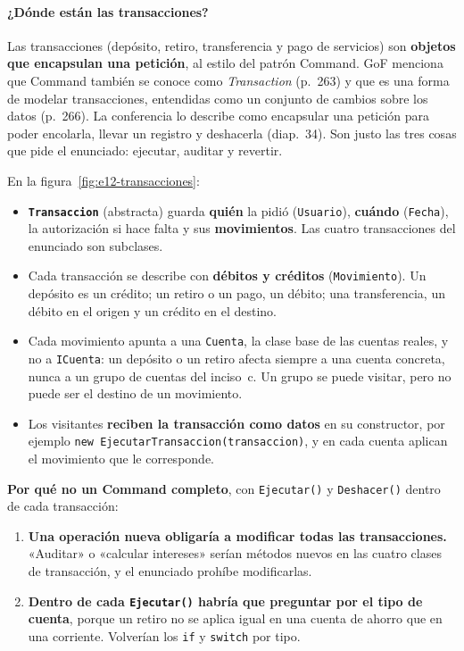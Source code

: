 \paragraph{¿Dónde están las transacciones?}
Las transacciones (depósito, retiro, transferencia y pago de servicios) son \textbf{objetos
que encapsulan una petición}, al estilo del patrón Command. GoF menciona que Command también
se conoce como \emph{Transaction} (p.~263) y que es una forma de modelar transacciones,
entendidas como un conjunto de cambios sobre los datos (p.~266). La conferencia lo describe
como encapsular una petición para poder encolarla, llevar un registro y deshacerla
(diap.~34). Son justo las tres cosas que pide el enunciado: ejecutar, auditar y revertir.

En la figura~\ref{fig:e12-transacciones}:
\begin{itemize}
  \item \textbf{\texttt{Transaccion}} (abstracta) guarda \textbf{quién} la pidió
        (\texttt{Usuario}), \textbf{cuándo} (\texttt{Fecha}), la autorización si hace falta y
        sus \textbf{movimientos}. Las cuatro transacciones del enunciado son subclases.
  \item Cada transacción se describe con \textbf{débitos y créditos} (\texttt{Movimiento}). Un
        depósito es un crédito; un retiro o un pago, un débito; una transferencia, un débito
        en el origen y un crédito en el destino.
  \item Cada movimiento apunta a una \texttt{Cuenta}, la clase base de las cuentas reales, y
        no a \texttt{ICuenta}: un depósito o un retiro afecta siempre a una cuenta concreta,
        nunca a un grupo de cuentas del inciso~c. Un grupo se puede visitar, pero no puede ser
        el destino de un movimiento.
  \item Los visitantes \textbf{reciben la transacción como datos} en su constructor, por
        ejemplo \texttt{new EjecutarTransaccion(\allowbreak{}transaccion)}, y en cada cuenta
        aplican el movimiento que le corresponde.
\end{itemize}

\textbf{Por qué no un Command completo}, con \texttt{Ejecutar()} y \texttt{Deshacer()} dentro
de cada transacción:
\begin{enumerate}
  \item \textbf{Una operación nueva obligaría a modificar todas las transacciones.}
        «Auditar» o «calcular intereses» serían métodos nuevos en las cuatro clases de
        transacción, y el enunciado prohíbe modificarlas.
  \item \textbf{Dentro de cada \texttt{Ejecutar()} habría que preguntar por el tipo de
        cuenta}, porque un retiro no se aplica igual en una cuenta de ahorro que en una
        corriente. Volverían los \texttt{if} y \texttt{switch} por tipo.
\end{enumerate}

